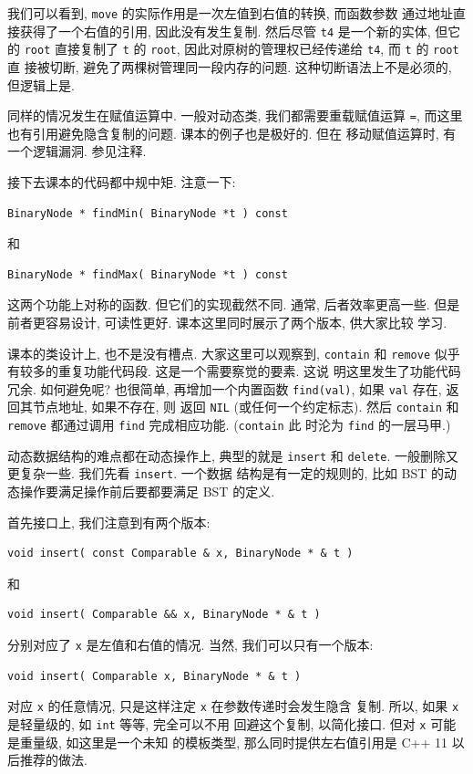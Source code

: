 \documentclass[a4paper]{ctexart}
\theoremstyle{definition}
\theoremstyle{definition}
\begin{document}
我们可以看到, \verb|move| 的实际作用是一次左值到右值的转换, 而函数参数
通过地址直接获得了一个右值的引用, 因此没有发生复制. 然后尽管 \verb|t4|
是一个新的实体, 但它的 \verb|root| 直接复制了 \verb|t| 的 \verb|root|,
因此对原树的管理权已经传递给 \verb|t4|, 而 \verb|t| 的 \verb|root| 直
接被切断, 避免了两棵树管理同一段内存的问题. 这种切断语法上不是必须的,
但逻辑上是.

同样的情况发生在赋值运算中. 一般对动态类, 我们都需要重载赋值运算
\verb|=|, 而这里也有引用避免隐含复制的问题. 课本的例子也是极好的. 但在
移动赋值运算时, 有一个逻辑漏洞. 参见注释.

接下去课本的代码都中规中矩. 注意一下:
\begin{verbatim}
BinaryNode * findMin( BinaryNode *t ) const
\end{verbatim}
和
\begin{verbatim}
BinaryNode * findMax( BinaryNode *t ) const
\end{verbatim}
这两个功能上对称的函数. 但它们的实现截然不同. 通常, 后者效率更高一些.
但是前者更容易设计, 可读性更好. 课本这里同时展示了两个版本, 供大家比较
学习.

课本的类设计上, 也不是没有槽点. 大家这里可以观察到, \verb|contain| 和
\verb|remove| 似乎有较多的重复功能代码段. 这是一个需要察觉的要素. 这说
明这里发生了功能代码冗余. 如何避免呢? 也很简单, 再增加一个内置函数
\verb|find(val)|, 如果 \verb|val| 存在, 返回其节点地址, 如果不存在, 则
返回 \verb|NIL| (或任何一个约定标志). 然后 \verb|contain| 和
\verb|remove| 都通过调用 \verb|find| 完成相应功能. (\verb|contain| 此
时沦为 \verb|find| 的一层马甲.)

动态数据结构的难点都在动态操作上, 典型的就是 \verb|insert| 和
\verb|delete|. 一般删除又更复杂一些. 我们先看 \verb|insert|. 一个数据
结构是有一定的规则的, 比如 BST 的动态操作要满足操作前后要都要满足 BST
的定义.


首先接口上, 我们注意到有两个版本:
\begin{verbatim}
void insert( const Comparable & x, BinaryNode * & t )
\end{verbatim}
和
\begin{verbatim}
void insert( Comparable && x, BinaryNode * & t )
\end{verbatim}
分别对应了 \verb|x| 是左值和右值的情况. 当然, 我们可以只有一个版本:
\begin{verbatim}
void insert( Comparable x, BinaryNode * & t )
\end{verbatim}
对应 \verb|x| 的任意情况, 只是这样注定 \verb|x| 在参数传递时会发生隐含
复制. 所以, 如果 \verb|x| 是轻量级的, 如 \verb|int| 等等, 完全可以不用
回避这个复制, 以简化接口. 但对 \verb|x| 可能是重量级, 如这里是一个未知
的模板类型, 那么同时提供左右值引用是 C++ 11 以后推荐的做法.
\end{document}
